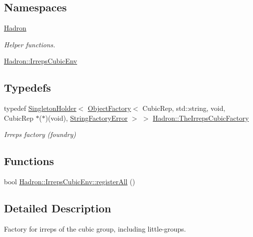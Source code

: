 \subsection*{Namespaces}
\begin{DoxyCompactItemize}
\item 
 \mbox{\hyperlink{namespaceHadron}{Hadron}}
\begin{DoxyCompactList}\small\item\em Helper functions. \end{DoxyCompactList}\item 
 \mbox{\hyperlink{namespaceHadron_1_1IrrepsCubicEnv}{Hadron\+::\+Irreps\+Cubic\+Env}}
\end{DoxyCompactItemize}
\subsection*{Typedefs}
\begin{DoxyCompactItemize}
\item 
typedef \mbox{\hyperlink{classUtil_1_1SingletonHolder}{Singleton\+Holder}}$<$ \mbox{\hyperlink{classUtil_1_1ObjectFactory}{Object\+Factory}}$<$ Cubic\+Rep, std\+::string, void, Cubic\+Rep $\ast$($\ast$)(void), \mbox{\hyperlink{structUtil_1_1StringFactoryError}{String\+Factory\+Error}} $>$ $>$ \mbox{\hyperlink{namespaceHadron_a9b693812688b7b56d095964989de20b2}{Hadron\+::\+The\+Irreps\+Cubic\+Factory}}
\begin{DoxyCompactList}\small\item\em Irreps factory (foundry) \end{DoxyCompactList}\end{DoxyCompactItemize}
\subsection*{Functions}
\begin{DoxyCompactItemize}
\item 
bool \mbox{\hyperlink{namespaceHadron_1_1IrrepsCubicEnv_a180ad30fa93d4d682cf36167092198ba}{Hadron\+::\+Irreps\+Cubic\+Env\+::register\+All}} ()
\end{DoxyCompactItemize}


\subsection{Detailed Description}
Factory for irreps of the cubic group, including little-\/groups. 

